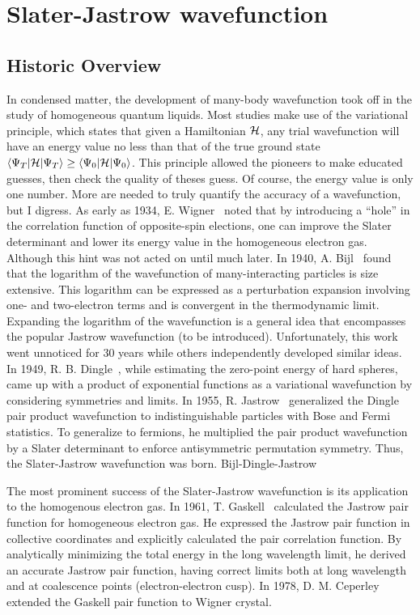 \chapter{Slater-Jastrow wavefunction}

\section{Historic Overview}

In condensed matter, the development of many-body wavefunction took off in the study of homogeneous quantum liquids. Most studies make use of the variational principle, which states that given a Hamiltonian $\mathcal{H}$, any trial wavefunction will have an energy value no less than that of the true ground state $\braket{\Psi_T|\mathcal{H}|\Psi_T}\ge\braket{\Psi_0|\mathcal{H}|\Psi_0}$. This principle allowed the pioneers to make educated guesses, then check the quality of theses guess. Of course, the energy value is only one number. More are needed to truly quantify the accuracy of a wavefunction, but I digress.
As early as 1934, E. Wigner~\cite{Wigner1934} noted that by introducing a “hole” in the correlation function of opposite-spin elections, one can improve the Slater determinant and lower its energy value in the homogeneous electron gas. Although this hint was not acted on until much later. In 1940, A. Bijl~\cite{Bijl1940} found that the logarithm of the wavefunction of many-interacting particles is size extensive. This logarithm can be expressed as a perturbation expansion involving one- and two-electron terms and is convergent in the thermodynamic limit. Expanding the logarithm of the wavefunction is a general idea that encompasses the popular Jastrow wavefunction (to be introduced). Unfortunately, this work went unnoticed for 30 years while others independently developed similar ideas. In 1949, R. B. Dingle~\cite{Dingle1949}, while estimating the zero-point energy of hard spheres, came up with a product of exponential functions as a variational wavefunction by considering symmetries and limits. In 1955, R. Jastrow~\cite{Jastrow1955} generalized the Dingle pair product wavefunction to indistinguishable particles with Bose and Fermi statistics. To generalize to fermions, he multiplied the pair product wavefunction by a Slater determinant to enforce antisymmetric permutation symmetry. Thus, the Slater-Jastrow wavefunction was born.
Bijl-Dingle-Jastrow

The most prominent success of the Slater-Jastrow wavefunction is its application to the homogenous electron gas. In 1961, T. Gaskell~\cite{Gaskell1961} calculated the Jastrow pair function for homogeneous electron gas. He expressed the Jastrow pair function in collective coordinates and explicitly calculated the pair correlation function. By analytically minimizing the total energy in the long wavelength limit, he derived an accurate Jastrow pair function, having correct limits both at long wavelength and at coalescence points (electron-electron cusp). In 1978, D. M. Ceperley extended the Gaskell pair function to Wigner crystal. %

